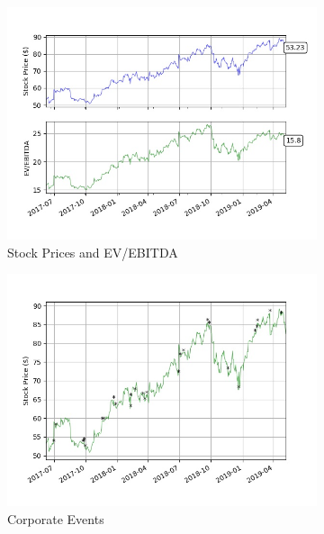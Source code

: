 \documentclass{article}
\begin{document}
\vfill\centering
{}
\begin{figure}[!h]
	\centering
	\begin{subfigure}[b]{0.75\linewidth}
		\includegraphics[width=\linewidth]{charts/graph.jpg}
		\caption{Stock Prices and EV/EBITDA}	
	\end{subfigure}
	\begin{subfigure}[b]{0.4\linewidth}
		\includegraphics[width=\linewidth]{charts/events.jpg}
		\caption{Corporate Events}
	\end{subfigure}
	\begin{subfigure}[b]{0.4\linewidth}

\end{subfigure}
\end{figure}
\end{document}
